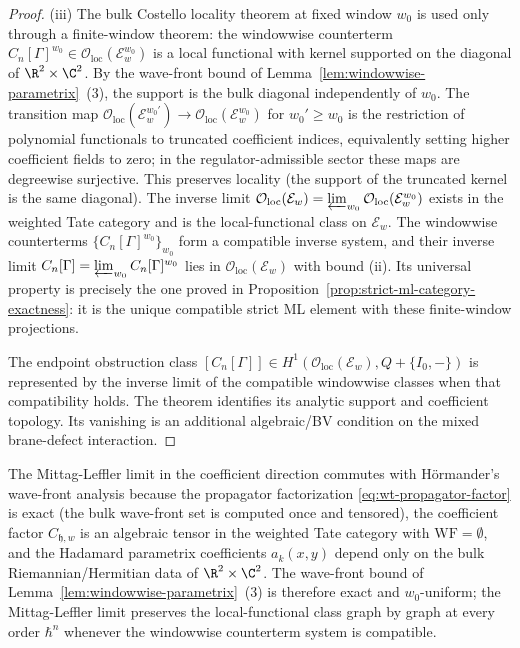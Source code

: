 \begin{proof}
  (iii) The bulk Costello locality theorem at fixed window $w_0$
  is used only through a finite-window theorem: the windowwise counterterm
  $C_n[\Gamma]^{w_0}\in\mathcal O_{\mathrm{loc}}(\mathcal E_w^{w_0})$
  is a local functional with kernel supported on the diagonal of
  $\R^2\times\C^2$. By the wave-front bound of
  Lemma~\ref{lem:windowwise-parametrix}~(3), the support is the
  bulk diagonal independently of $w_0$. The transition map
  $\mathcal O_{\mathrm{loc}}(\mathcal E_w^{w_0'})\to
  \mathcal O_{\mathrm{loc}}(\mathcal E_w^{w_0})$ for $w_0'\geq w_0$
  is the restriction of polynomial functionals to truncated
  coefficient indices, equivalently setting higher coefficient fields
  to zero; in the regulator-admissible sector these maps are
  degreewise surjective.  This preserves locality (the support of the
  truncated kernel is the same diagonal). The inverse limit
  $\mathcal O_{\mathrm{loc}}(\mathcal E_w)=
  \varprojlim_{w_0}\mathcal O_{\mathrm{loc}}(\mathcal E_w^{w_0})$
  exists in the weighted Tate category and is the
  local-functional class on $\mathcal E_w$. The windowwise counterterms
  $\{C_n[\Gamma]^{w_0}\}_{w_0}$ form a compatible inverse system,
  and their inverse limit
  $C_n[\Gamma]=\varprojlim_{w_0}C_n[\Gamma]^{w_0}$ lies in
  $\mathcal O_{\mathrm{loc}}(\mathcal E_w)$ with bound (ii).
  Its universal property is precisely the one proved in
  Proposition~\ref{prop:strict-ml-category-exactness}: it is the unique
  compatible strict ML element with these finite-window projections.

  The endpoint obstruction class
  $[C_n[\Gamma]]\in H^1(\mathcal O_{\mathrm{loc}}(\mathcal E_w),
  Q+\{I_0,-\})$ is represented by the inverse limit of the compatible
  windowwise classes when that compatibility holds.  The theorem
  identifies its analytic support and coefficient topology.  Its
  vanishing is an additional algebraic/BV condition on the mixed
  brane-defect interaction.
\end{proof}

\begin{rmk}\label{rmk:hormander-commutation}
  The Mittag-Leffler limit in the coefficient direction commutes with
  Hörmander's wave-front analysis because the propagator factorization
  \eqref{eq:wt-propagator-factor} is exact (the bulk wave-front set is
  computed once and tensored), the coefficient factor
  $C_{\mathfrak h,w}$ is an algebraic tensor in the weighted Tate
  category with $\mathrm{WF}=\emptyset$, and the Hadamard parametrix
  coefficients $a_k(x,y)$ depend only on the bulk Riemannian/Hermitian
  data of $\R^2\times\C^2$.  The wave-front bound of
  Lemma~\ref{lem:windowwise-parametrix}~(3) is therefore exact and
  $w_0$-uniform; the Mittag-Leffler limit preserves the
  local-functional class graph by graph at every order $\hbar^n$
  whenever the windowwise counterterm system is compatible.
\end{rmk}

